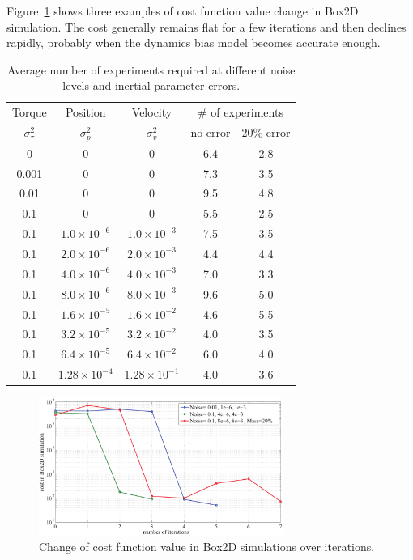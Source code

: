 \documentclass[letterpaper, 10 pt, conference]{ieeeconf}
\begin{document}
Figure~\ref{fig:learning_cost-iteration} shows three examples of cost function
value change in Box2D simulation.
The cost generally remains flat for a few iterations and then declines
rapidly, probably when the dynamics bias model becomes accurate enough.

\begin{table}
\begin{center}
\caption{Average number of experiments required at different noise
 levels and inertial parameter errors.} \label{tab:learning_exp-noise}
\begin{tabular}{c|c|c|c|c}
\hline
Torque & Position & Velocity & 
\multicolumn{2}{c}{\# of experiments}\\\cline{4-5}
$\sigma_{\tau}^2$ & $\sigma_p^2$ & $\sigma_v^2$ & 
{\footnotesize no error} &
{\footnotesize 20\% error} \\\hline
0 & 0 & 0 & 6.4 & 2.8 \\
0.001 & 0 & 0 & 7.3 & 3.5 \\
0.01 & 0 & 0 & 9.5 & 4.8 \\
0.1 & 0 & 0 & 5.5 & 2.5 \\\hline
0.1 & $1.0\times 10^{-6}$ & $1.0\times 10^{-3}$ & 7.5 & 3.5 \\
0.1 & $2.0\times 10^{-6}$ & $2.0\times 10^{-3}$ & 4.4 & 4.4 \\
0.1 & $4.0\times 10^{-6}$ & $4.0\times 10^{-3}$ & 7.0 & 3.3 \\
0.1 & $8.0\times 10^{-6}$ & $8.0\times 10^{-3}$ & 9.6 & 5.0 \\
0.1 & $1.6\times 10^{-5}$ & $1.6\times 10^{-2}$ & 4.6 & 5.5 \\
0.1 & $3.2\times 10^{-5}$ & $3.2\times 10^{-2}$ & 4.0 & 3.5 \\
0.1 & $6.4\times 10^{-5}$ & $6.4\times 10^{-2}$ & 6.0 & 4.0 \\
0.1 & $1.28\times 10^{-4}$ & $1.28\times 10^{-1}$ & 4.0 & 3.6 \\\hline
\end{tabular}
\end{center}
\end{table}

\begin{figure}[tb]
\begin{center}
\includegraphics[width=80mm]{eps/cost_iteration.pdf}
\caption{Change of cost function value in Box2D simulations over
 iterations.}
\label{fig:learning_cost-iteration}
\end{center}
\end{figure}
\end{document}
